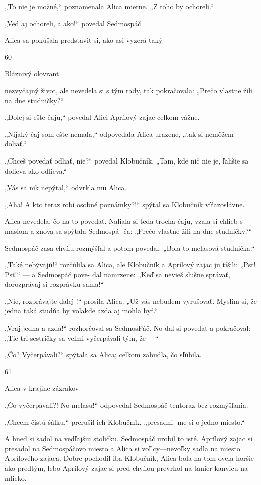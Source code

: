 \documentclass[12pt]{article}
\begin{document}
\begin{Parallel}[p]{}{}
{{„To nie je možné,“ poznamenala Alica mierne. „Z toho
by ochoreli.“

„Ved aj ochoreli, a ako!“ povedal Sedmospáč.

Alica sa pokúšala predstavit si, ako asi vyzerá taký

60

Bláznivý olovrant

nezvyčajný život, ale nevedela si
s tým rady, tak pokračovala: „Prečo
vlastne žili na dne studničky?“

„Dolej si ešte čaju,“ povedal Alici
Aprílový zajac celkom vážne.

„Nijaký čaj som ešte nemala,“
odpovedala Alica urazene, „tak si nemôžem doliať.“

„Chceš povedať odliať, nie?“ povedal Klobučník. „Tam,
kde nič nie je, ľahšie sa dolieva ako odlieva.“

„Vás sa nik nepýtal,“ odvrkla mu Alica.

„Aha! A kto teraz robí osobné poznámky?!“ spýtal sa
Klobučník víťazoslávne.

Alica nevedela, čo na to povedať. Naliala si teda trocha
čaju, vzala si chlieb s maslom a znova sa spýtala Sedmospá-
ča: „Prečo vlastne žili na dne studničky?“

Sedmospáč zasa chvíľu rozmýšľal a potom povedal: „Bola
to melasová studnička.“

„Také nebývajú!“ rozčúlila sa Alica, ale Klobučník
a Aprílový zajac ju tíšili: „Pst! Pst!“ — a Sedmospáč pove-
dal namrzene: „Keď sa nevieš slušne správať, dorozprávaj
si rozprávku sama!“

„Nie, rozprávajte ďalej !“ prosila Alica. „Už vás nebudem
vyrušovať. Myslím si, že jedna taká studňa by voľakde azda
aj mohla byť.“

„Vraj jedna a azda!“ rozhorčoval sa SedmosPáč. No dal si
povedať a pokračoval: „Tie tri sestričky sa veľmi vyčerpávali
tým, že —“

„Čo? Vyčerpávali?“ spýtala sa Alica; celkom zabudla, čo
sľúbila.

 

61

Alica v krajine zázrakov

„Čo vyčerpávali?! No melasu!“ odpovedal Sedmospáč
tentoraz bez rozmýšľania.

„Chcem čistú šálku,“ prerušil ich Klobučník, „presadni-
me si o jedno miesto.“

A hned si sadol na vedľajšiu stoličku. Sedmospáč urobil to
isté. Aprílový zajac si presadol na Sedmospáčovo miesto
a Alica si voľlcy—nevoľky sadla na miesto Aprílového zajaca.
Dobre pochodil iba Klobučník, Alica bola na tom oveľa
horšie ako predtým, lebo Aprílový zajac si pred chvíľou
prevrhol na tanier kanvicu na mlieko.

}}
\end{Parallel}
\end{document}
